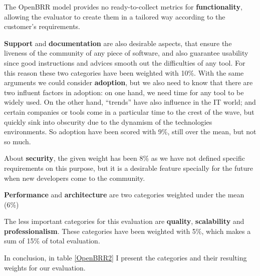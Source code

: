 \documentclass[a4paper,12pt]{book}
\begin{document}
The OpenBRR model provides no ready-to-collect metrics for
\textbf{functionality}, allowing the evaluator to create them in a tailored way
according to the customer's requirements. 


\textbf{Support} and \textbf{documentation} are also desirable aspects, that
ensure the liveness of the community of any piece of software, and also
guarantee usability since good instructions and advices smooth out the
difficulties of any tool. For this reason these two categories have been
weighted with 10\%. With the same arguments we could consider
\textbf{adoption}, but we also need to know that there are two influent factors
in adoption: on one hand, we need time for any tool to be widely used. On the
other hand, ``trends'' have also influence in the IT world; and certain
companies or tools come in a particular time to the crest of the wave, but
quickly sink into obscurity due to the dynamism of the technologies
environments. So adoption have been scored with 9\%, still over the mean, but
not so much.

About \textbf{security}, the given weight has been 8\% as we have not defined specific requirements on this purpose, but it is a desirable feature specially for the future when new developers come to the community.

\textbf{Performance} and \textbf{architecture} are two categories weighted under the mean (6\%)

The less important categories for this evaluation are \textbf{quality},
\textbf{scalability} and \textbf{professionalism}. These categories have been
weighted with 5\%, which makes a sum of 15\% of total evaluation. 

In conclusion, in table \ref{OpenBRR2} I present the categories and
their resulting weights for our evaluation.
\end{document}
